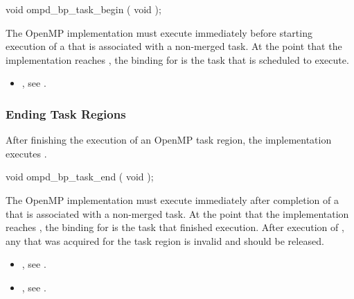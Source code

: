 \format
\begin{cspecific}
\begin{ompSyntax}
void ompd_bp_task_begin ( void );
\end{ompSyntax}
\end{cspecific}

\descr
The OpenMP implementation must execute  
immediately before starting execution of a  that is
associated with a non-merged task. At the point that the implementation 
reaches , the binding for 
 is the task that is scheduled to execute.

\crossreferences
\begin{itemize}
\item {}, 
see .
\end{itemize}



\subsubsection{Ending Task Regions}
\label{subsubsec:ompd_bp_task_end}

\summary
After finishing the execution of an OpenMP task region, 
the implementation executes .

\format
\begin{cspecific}
\begin{ompSyntax}
void ompd_bp_task_end ( void );
\end{ompSyntax}
\end{cspecific}

\descr
The OpenMP implementation must execute  immediately
after completion of a  that is associated with a 
non-merged task. At the point that the implementation reaches 
, the binding for  
is the task that finished execution. After execution of , 
any  that was acquired for the task region is invalid and 
should be released.

\crossreferences
\begin{itemize}
\item {}, 
see .

\item {}, see .
\end{itemize}



